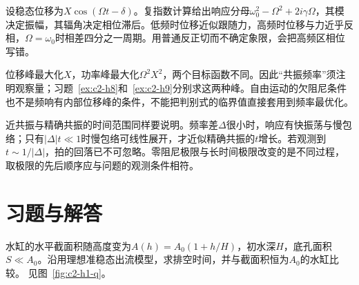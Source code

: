 设稳态位移为$X\cos(\Omega t-\delta)$。复指数计算给出响应分母$\omega_0^2-\Omega^2+2i\gamma\Omega$，其模决定振幅，其辐角决定相位滞后。低频时位移近似跟随力，高频时位移与力近乎反相，$\Omega=\omega_0$时相差四分之一周期。用普通反正切而不确定象限，会把高频区相位写错。

位移峰最大化$X$，功率峰最大化$\Omega^2X^2$，两个目标函数不同。因此“共振频率”须注明观察量；习题~\ref{ex:c2-h8}和~\ref{ex:c2-h9}分别求这两种峰。自由运动的欠阻尼条件也不是频响有内部位移峰的条件，不能把判别式的临界值直接套用到频率最优化。

近共振与精确共振的时间范围同样要说明。频率差$\Delta$很小时，响应有快振荡与慢包络；只有$|\Delta|t\ll1$时慢包络可线性展开，才近似精确共振的$t$增长。若观测到$t\sim1/|\Delta|$，拍的回落已不可忽略。零阻尼极限与长时间极限改变的是不同过程，取极限的先后顺序应与问题的观测条件相符。


\section{习题与解答}\label{sec:c2-exercises}

\begin{exercise}[变截面水缸]\label{ex:c2-h1}
水缸的水平截面积随高度变为$A(h)=A_0(1+h/H)$，初水深$H$，底孔面积$S\ll A_0$。沿用理想准稳态出流模型，求排空时间，并与截面积恒为$A_0$的水缸比较。 见图~\ref{fig:c2-h1-q}。
\end{exercise}

